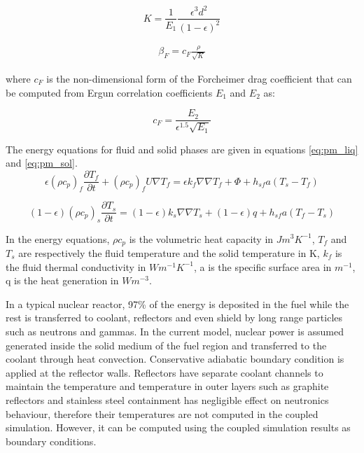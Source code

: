 \documentclass{elsarticle}
\begin{document}
\begin{equation}
      K = \frac{1}{E_1}\frac{\epsilon^3 d^2}{(1-\epsilon)^2}
      \label{eq:K}
\end{equation}

\begin{align}
  \beta_F = c_F \frac{\rho}{\sqrt{K}}
  \label{eq:betaf}
\end{align}

where $c_F$ is the non-dimensional form of the Forcheimer drag coefficient that can be computed from Ergun correlation coefficients $E_1$ and $E_2$ as:

\begin{equation}
    c_F = \frac{E_2}{\epsilon^{1.5}\sqrt{E_1}}
\end{equation}



The energy equations for fluid and solid phases are given in equations \ref{eq:pm_liq} and \ref{eq:pm_sol}.
\begin{equation}
  \epsilon(\rho c_p)_f \frac{\partial T_f}{\partial t} + (\rho c_p)_f U\nabla T_f = \epsilon k_f \nabla\nabla T_f + \Phi + h_{sf}a(T_s - T_f)
  \label{eq:pm_liq}
\end{equation}

\begin{equation}
  (1-\epsilon)(\rho c_p)_s \frac{\partial T_s}{\partial t} =(1-\epsilon)k_s \nabla\nabla T_s + (1-\epsilon)q + h_{sf}a(T_f - T_s)
  \label{eq:pm_sol}
\end{equation}

In the energy equations, $\rho c_p$ is the volumetric heat capacity in $Jm^3K^{-1}$, $T_f$ and $T_s$ are respectively the fluid temperature and the solid temperature in K, $k_f$ is the fluid thermal conductivity in $Wm^{-1}K^{-1}$, a is the specific surface area in $m^{-1}$, q is the heat generation in $Wm^{-3}$.

In a typical nuclear reactor, 97\% of the energy is deposited in the fuel while the rest is transferred to coolant, reflectors and even shield by long range particles such as neutrons and gammas. 
In the current model, nuclear power is assumed generated inside the solid medium of the fuel region and transferred to the coolant through heat convection. Conservative adiabatic boundary condition is applied at the reflector walls. Reflectors have separate coolant channels to maintain the temperature and temperature in outer layers such as graphite reflectors and stainless steel containment has negligible effect on neutronics behaviour, therefore their temperatures are not computed in the coupled simulation. However, it can be computed using the coupled simulation results as boundary conditions.
\end{document}
